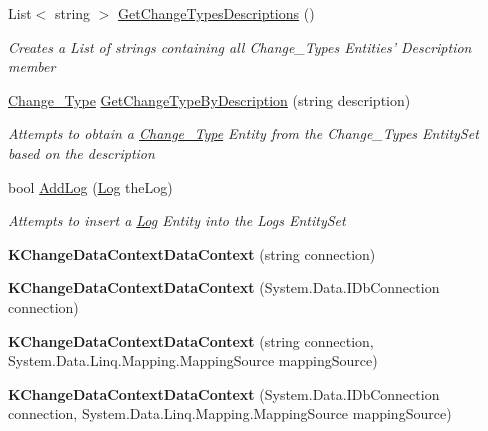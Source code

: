 \begin{DoxyCompactItemize}
List$<$ string $>$ \hyperlink{class_k_change_logger_1_1_k_change_data_context_data_context_a9d082bdbd0af6324e6cce7aead4aa701}{Get\-Change\-Types\-Descriptions} ()
\begin{DoxyCompactList}\small\item\em Creates a List of strings containing all Change\-\_\-\-Types Entities' Description member \end{DoxyCompactList}\item 
\hyperlink{class_k_change_logger_1_1_change___type}{Change\-\_\-\-Type} \hyperlink{class_k_change_logger_1_1_k_change_data_context_data_context_a780e39d6db6f0a3f3f78730bcdc2baad}{Get\-Change\-Type\-By\-Description} (string description)
\begin{DoxyCompactList}\small\item\em Attempts to obtain a \hyperlink{class_k_change_logger_1_1_change___type}{Change\-\_\-\-Type} Entity from the Change\-\_\-\-Types Entity\-Set based on the description \end{DoxyCompactList}\item 
bool \hyperlink{class_k_change_logger_1_1_k_change_data_context_data_context_ab8c5a90ec61abdcc352136fbe3aa4900}{Add\-Log} (\hyperlink{class_k_change_logger_1_1_log}{Log} the\-Log)
\begin{DoxyCompactList}\small\item\em Attempts to insert a \hyperlink{class_k_change_logger_1_1_log}{Log} Entity into the Logs Entity\-Set \end{DoxyCompactList}\item 
\hypertarget{class_k_change_logger_1_1_k_change_data_context_data_context_a3dab4bd0b8e3c4550fe29ed9fcd708df}{{\bfseries K\-Change\-Data\-Context\-Data\-Context} (string connection)}\label{class_k_change_logger_1_1_k_change_data_context_data_context_a3dab4bd0b8e3c4550fe29ed9fcd708df}

\item 
\hypertarget{class_k_change_logger_1_1_k_change_data_context_data_context_a622c9e91920e94e94b5e8e7d7425f94c}{{\bfseries K\-Change\-Data\-Context\-Data\-Context} (System.\-Data.\-I\-Db\-Connection connection)}\label{class_k_change_logger_1_1_k_change_data_context_data_context_a622c9e91920e94e94b5e8e7d7425f94c}

\item 
\hypertarget{class_k_change_logger_1_1_k_change_data_context_data_context_ae8c62d84f8a522da9083ab1bfc7f8dc6}{{\bfseries K\-Change\-Data\-Context\-Data\-Context} (string connection, System.\-Data.\-Linq.\-Mapping.\-Mapping\-Source mapping\-Source)}\label{class_k_change_logger_1_1_k_change_data_context_data_context_ae8c62d84f8a522da9083ab1bfc7f8dc6}

\item 
\hypertarget{class_k_change_logger_1_1_k_change_data_context_data_context_a07d479f1686ab39cd071e7905452c7a5}{{\bfseries K\-Change\-Data\-Context\-Data\-Context} (System.\-Data.\-I\-Db\-Connection connection, System.\-Data.\-Linq.\-Mapping.\-Mapping\-Source mapping\-Source)}\label{class_k_change_logger_1_1_k_change_data_context_data_context_a07d479f1686ab39cd071e7905452c7a5}

\end{DoxyCompactItemize}
